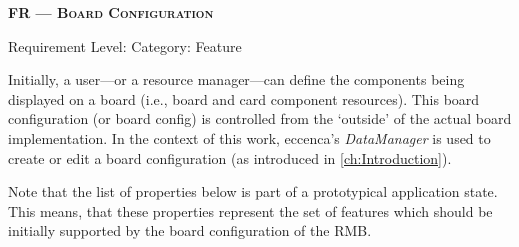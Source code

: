 \newpage


\setcounter{fr}{0}


\centerline{\textbf{FR\textsubscript{} --- \textsc{Board Configuration}}}

\centerline{\small Requirement Level:  \quad{} Category: Feature}

\noindent Initially, a user---or a resource manager---can define the components being displayed on a board (i.e., board and card component resources). This board configuration (or board config) is controlled from the ‘outside’ of the actual board implementation. In the context of this work, eccenca’s \textit{DataManager} is used to create or edit a board configuration (as introduced in \autoref{ch:Introduction}).

Note that the list of properties below is part of a prototypical application state. This means, that these properties represent the set of features which should be initially supported by the board configuration of the \acrshort*{RMB}.


